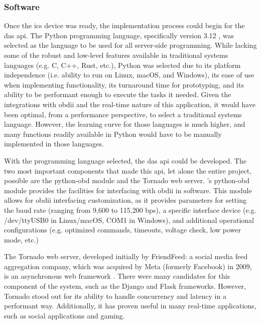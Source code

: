         \subsubsection{Software}
            \par Once the \gls{ics} device was ready, the implementation process could begin for the \gls{das} \gls{api}. The Python programming language, specifically version 3.12 \cite{PSF2025}, was selected as the language to be used for all server-side programming. While lacking some of the robust and low-level features available in traditional systems languages (e.g. C, C++, Rust, etc.), Python was selected due to its platform independence (i.e. ability to run on Linux, macOS, and Windows), its ease of use when implementing functionality, its turnaround time for prototyping, and its ability to be performant enough to execute the tasks it needed. Given the integrations with \gls{obdii} and the real-time nature of this application, it would have been optimal, from a performance perspective, to select a traditional systems language. However, the learning curve for those languages is much higher, and many functions readily available in Python would have to be manually implemented in those languages.

            \par With the programming language selected, the \gls{das} \gls{api} could be developed. The two most important components that made this \gls{api}, let alone the entire project, possible are the python-obd module and the Tornado web server. \cite{Whitfield2025}'s python-obd module provides the facilities for interfacing with \gls{obdii} in software. This module allows for \gls{obdii} interfacing customization, as it provides parameters for setting the baud rate (ranging from 9,600 to 115,200 \gls{bps}), a specific interface device (e.g. /dev/ttyUSB0 in Linux/macOS, COM1 in Windows), and additional operational configurations (e.g. optimized commands, timeouts, voltage check, low power mode, etc.)

            \par The Tornado web server, developed initially by FriendFeed: a social media feed aggregation company, which was acquired by Meta (formerly Facebook) in 2009, is an asynchronous web framework \cite{TornadoAuthors2025}. There were many candidates for this component of the system, such as the Django and Flask frameworks. However, Tornado stood out for its ability to handle concurrency and latency in a performant way. Additionally, it has proven useful in many real-time applications, such as social applications and gaming.

